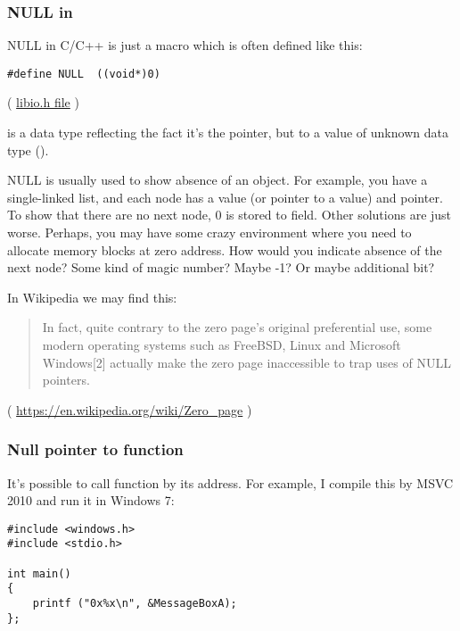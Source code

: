 \subsubsection{NULL in \CCpp}

NULL in C/C++ is just a macro which is often defined like this:

\begin{lstlisting}[style=customc]
#define NULL  ((void*)0)
\end{lstlisting}
( \href{https://github.com/wzhy90/linaro_toolchains/blob/8ff8ae680bac04558d10cc9626e12c4c2f6c1348/arm-cortex_a15-linux-gnueabihf/libc/usr/include/libio.h#L70}{libio.h file} )

 is a data type reflecting the fact it's the pointer, but to a value of unknown data type ().

NULL is usually used to show absence of an object.
For example, you have a single-linked list, and each node has a value (or pointer to a value) and  pointer.
To show that there are no next node, 0 is stored to  field.
Other solutions are just worse.
Perhaps, you may have some crazy environment where you need to allocate memory blocks at zero address. How would you indicate absence of the next node?
Some kind of magic number? Maybe -1? Or maybe additional bit?

In Wikipedia we may find this:

\begin{framed}
\begin{quotation}
In fact, quite contrary to the zero page's original preferential use, some modern operating systems such as FreeBSD, Linux and Microsoft Windows[2] actually make the zero page inaccessible to trap uses of NULL pointers. 
\end{quotation}
\end{framed}
( \url{https://en.wikipedia.org/wiki/Zero_page} )

\subsubsection{Null pointer to function}

It's possible to call function by its address.
For example, I compile this by MSVC 2010 and run it in Windows 7:

\begin{lstlisting}[style=customc]
#include <windows.h>
#include <stdio.h>

int main()
{
	printf ("0x%x\n", &MessageBoxA);
};
\end{lstlisting}

